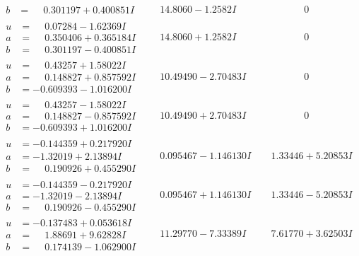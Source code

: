 \documentclass[1p]{elsarticle_modified}
\theoremstyle{definition}
\begin{document}
$$\begin{array}{c|c|c}
\begin{aligned}
b &= \phantom{-}0.301197 + 0.400851 I\end{aligned}
 & \phantom{-}14.8060 - 1.2582 I & \phantom{-0.000000 } 0 \\ \hline\begin{aligned}
u &= \phantom{-}0.07284 - 1.62369 I \\
a &= \phantom{-}0.350406 + 0.365184 I \\
b &= \phantom{-}0.301197 - 0.400851 I\end{aligned}
 & \phantom{-}14.8060 + 1.2582 I & \phantom{-0.000000 } 0 \\ \hline\begin{aligned}
u &= \phantom{-}0.43257 + 1.58022 I \\
a &= \phantom{-}0.148827 + 0.857592 I \\
b &= -0.609393 - 1.016200 I\end{aligned}
 & \phantom{-}10.49490 - 2.70483 I & \phantom{-0.000000 } 0 \\ \hline\begin{aligned}
u &= \phantom{-}0.43257 - 1.58022 I \\
a &= \phantom{-}0.148827 - 0.857592 I \\
b &= -0.609393 + 1.016200 I\end{aligned}
 & \phantom{-}10.49490 + 2.70483 I & \phantom{-0.000000 } 0 \\ \hline\begin{aligned}
u &= -0.144359 + 0.217920 I \\
a &= -1.32019 + 2.13894 I \\
b &= \phantom{-}0.190926 + 0.455290 I\end{aligned}
 & \phantom{-}0.095467 - 1.146130 I & \phantom{-}1.33446 + 5.20853 I \\ \hline\begin{aligned}
u &= -0.144359 - 0.217920 I \\
a &= -1.32019 - 2.13894 I \\
b &= \phantom{-}0.190926 - 0.455290 I\end{aligned}
 & \phantom{-}0.095467 + 1.146130 I & \phantom{-}1.33446 - 5.20853 I \\ \hline\begin{aligned}
u &= -0.137483 + 0.053618 I \\
a &= \phantom{-}1.88691 + 9.62828 I \\
b &= \phantom{-}0.174139 - 1.062900 I\end{aligned}
 & \phantom{-}11.29770 - 7.33389 I & \phantom{-}7.61770 + 3.62503 I \\ \hline\begin{aligned}

\end{aligned}
\end{array}$$
\end{document}
